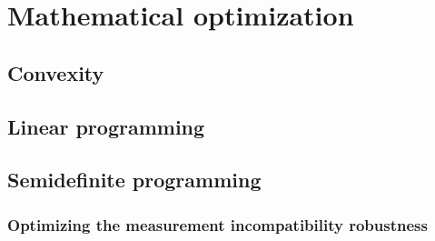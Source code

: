 \chapter{Mathematical optimization}
\thispagestyle{empty}  %
	
	\section{Convexity}
	\label{sec:convexity}

	\section{Linear programming}
	\label{sec:linear-programming}

	\section{Semidefinite programming}
	\label{sec:sdp}

		\subsection{Optimizing the measurement incompatibility robustness}
		\label{sec:incompatibility-robustness}